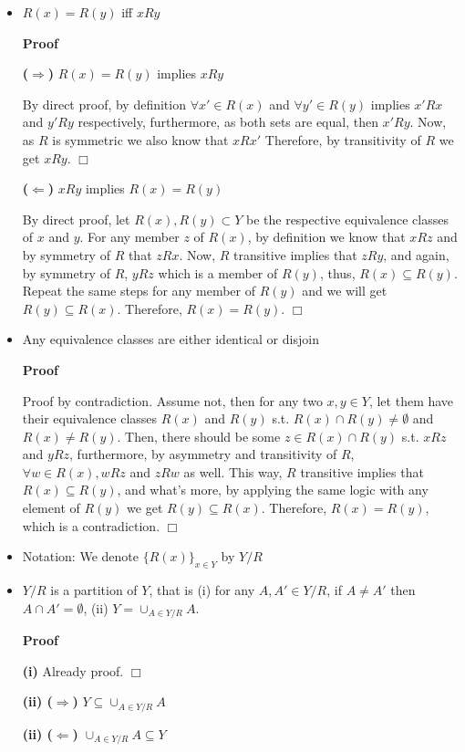 \documentclass{article}
\theoremstyle{definition}
\begin{document}
\begin{itemize}
\item $R(x)=R(y)$ iff $xRy$

{\bf Proof}

{\bf ($\Rightarrow$)} $R(x)=R(y)$ implies $xRy$

By direct proof, by definition $\forall x' \in R(x)$ and $\forall y'\in R(y)$ implies $x'Rx$ and $y'Ry$ respectively, furthermore, as both sets are equal, then $x'Ry$. Now, as $R$ is symmetric we also know that $xRx'$ Therefore, by transitivity of $R$ we get $xRy$. $\Box$

{\bf ($\Leftarrow$)} $xRy$ implies $R(x)=R(y)$

By direct proof, let $R(x), R(y) \subset Y$ be the respective equivalence classes of $x$ and $y$. For any member $z$ of $R(x)$, by definition we know that $xRz$ and by symmetry of $R$ that $zRx$. Now, $R$ transitive implies that $zRy$, and again, by symmetry of $R$, $yRz$ which is a member of $R(y)$, thus, $R(x)\subseteq R(y)$. Repeat the same steps for any member of $R(y)$ and we will get $R(y)\subseteq R(x)$. Therefore, $R(x)=R(y)$. $\Box$

\item Any equivalence classes are either identical or disjoin

{\bf Proof}

Proof by contradiction. Assume not, then for any two $x,y\in Y$, let them have their equivalence classes $R(x)$ and $R(y)$ s.t. $R(x)\cap R(y)\not=\emptyset$ and $R(x)\not=R(y)$. Then, there should be some $z\in R(x)\cap R(y)$ s.t. $xRz$ and $yRz$, furthermore, by asymmetry and transitivity of $R$, $\forall w\in R(x), wRz$ and $zRw$ as well. This way, $R$ transitive implies that $R(x)\subseteq R(y)$, and what's more, by applying the same logic with any element of $R(y)$ we get $R(y)\subseteq R(x)$. Therefore, $R(x)=R(y)$, which is a contradiction. $\Box$

\item[] Notation: We denote $\{R(x)\}_{x\in Y}$ by $Y/R$
\item $Y/R$ is a partition of $Y$, that is (i) for any $A,A'\in Y/R$, if $A\not=A'$ then $A\cap A'=\emptyset$, (ii) $Y=\cup_{A\in Y/R}A$.

{\bf Proof}

{\bf (i)} Already proof. $\Box$

{\bf (ii) ($\Rightarrow$)} $Y\subseteq \cup_{A\in Y/R}A$

{\bf (ii) ($\Leftarrow$)} $\cup_{A\in Y/R}A \subseteq Y$


\end{itemize}
\end{document}
